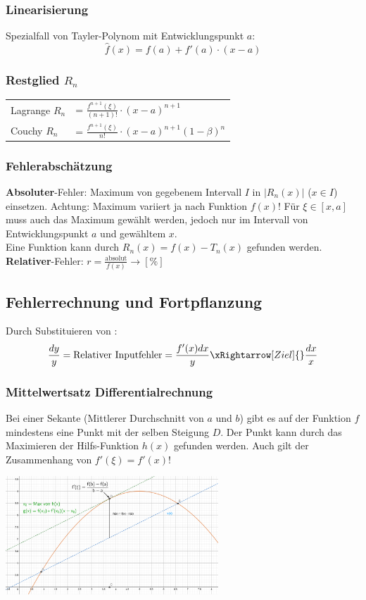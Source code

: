 \subsubsection{Linearisierung}
Spezialfall von Tayler-Polynom mit Entwicklungspunkt $a$:
\[\hat{f}(x) = f(a) + f'(a)\cdot(x - a)\]

\subsubsection{Restglied $R_n$}
\begin{tabular}{ll}
	Lagrange $R_n$ &= $\frac{f^{n + 1}(\xi)}{(n + 1)!} \cdot (x - a)^{n+1}$\\
	Couchy $R_n$ &= $\frac{f^{n + 1}(\xi)}{n!} \cdot (x - a)^{n+1} (1 - \beta)^n$
\end{tabular}


\subsubsection{Fehlerabschätzung}
\textbf{Absoluter}-Fehler: Maximum von gegebenem Intervall $I$ in $\left|R_n(x)\right|$ ($x \in I$) einsetzen. Achtung: Maximum variiert ja nach Funktion $f(x)$! Für $\xi \in [x, a]$ muss auch das Maximum gewählt werden, jedoch nur im Intervall von Entwicklungspunkt $a$ und gewähltem $x$.\\

\noindent Eine Funktion kann durch $R_n(x) = f(x) - T_n(x)$ gefunden werden.\\

\noindent\textbf{Relativer}-Fehler: $r = \frac{\text{absolut}}{f(x)} \rightarrow [\%]$

\subsection{Fehlerrechnung und Fortpflanzung}\todo{}
Durch Substituieren von :
\[
\dfrac{dy}{y} = \text{Relativer Inputfehler} = \dfrac{f'(x)dx}{y} \xRightarrow[Ziel]{}\dfrac{dx}{x}
\]

\subsubsection{Mittelwertsatz Differentialrechnung}
Bei einer Sekante (Mittlerer Durchschnitt von $a$ und $b$) gibt es auf der Funktion $f$ mindestens eine Punkt mit der selben Steigung $D$. Der Punkt kann durch das Maximieren der Hilfs-Funktion $h(x)$ gefunden werden. Auch gilt der Zusammenhang von $f'(\xi) = f'(x)$!
\begin{center}
	\includegraphics[height=12em]{./Images/Mittelwertsatz.png}
\end{center}

